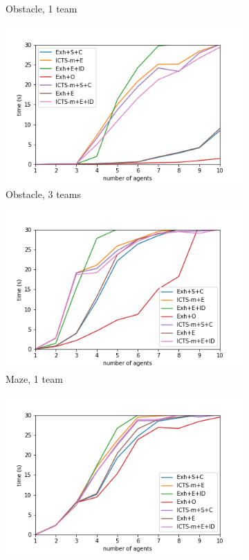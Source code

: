 \documentclass[english]{article}
\begin{document}
\begin{figure}
\begin{subfigure}{0.49\textwidth}
			\caption{Obstacle, 1 team}
			\label{fig:obstacle1}
		\end{subfigure}
		\begin{subfigure}{0.49\textwidth}
		\centering
		\includegraphics[width=\linewidth]{img/results/obstacle-3}
		\caption{Obstacle, 3 teams}
		\label{fig:obstacle3}
		\end{subfigure}
		\begin{subfigure}{0.49\textwidth}
			\centering
			\includegraphics[width=\linewidth]{img/results/maze-1}
			\caption{Maze, 1 team}
			\label{fig:m1}
		\end{subfigure}
		\begin{subfigure}{0.49\textwidth}
			\centering
			\includegraphics[width=\linewidth]{img/results/maze-3}

\end{subfigure}
\end{figure}
\end{document}
